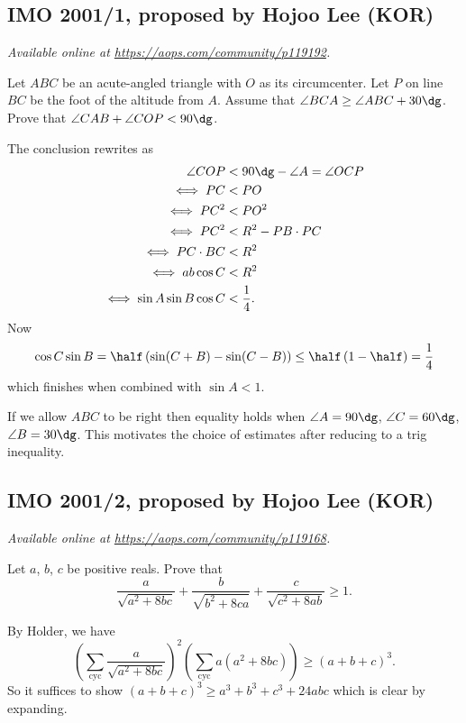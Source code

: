 \documentclass[11pt]{scrartcl}
\begin{document}
\subsection{IMO 2001/1, proposed by Hojoo Lee (KOR)}
\textsl{Available online at \url{https://aops.com/community/p119192}.}
\begin{mdframed}[style=mdpurplebox,frametitle={Problem statement}]
Let $ABC$ be an acute-angled triangle with $O$ as its circumcenter.
Let $P$ on line $BC$ be the foot of the altitude from $A$.
Assume that $\angle BCA \ge \angle ABC + 30\dg$.
Prove that $\angle CAB + \angle COP < 90\dg$.
\end{mdframed}
The conclusion rewrites as
\begin{align*}
  \angle COP &< 90\dg - \angle A = \angle OCP \\
  \iff PC &< PO \\
  \iff PC^2 &< PO^2 \\
  \iff PC^2 &< R^2 - PB \cdot PC \\
  \iff PC \cdot BC &< R^2 \\
  \iff ab \cos C  &< R^2 \\
  \iff \sin A \sin B \cos C & < \frac14.
\end{align*}
Now
\[ \cos C \sin B
  = \half \left( \sin(C+B)-\sin(C-B) \right)
  \le \half \left( 1 - \half \right) = \frac 14 \]
which finishes when combined with $\sin A < 1$.

\begin{remark*}
  If we allow $ABC$ to be right then
  equality holds when $\angle A = 90\dg$,
  $\angle C = 60\dg$, $\angle B = 30\dg$.
  This motivates the choice of estimates
  after reducing to a trig inequality.
\end{remark*}
\pagebreak

\subsection{IMO 2001/2, proposed by Hojoo Lee (KOR)}
\textsl{Available online at \url{https://aops.com/community/p119168}.}
\begin{mdframed}[style=mdpurplebox,frametitle={Problem statement}]
Let $a$, $b$, $c$ be positive reals. Prove that
\[ \frac{a}{\sqrt{a^2+8bc}} + \frac{b}{\sqrt{b^2+8ca}} + \frac{c}{\sqrt{c^2+8ab}} \ge 1. \]
\end{mdframed}
By Holder, we have
\[
  \left( \sum_{\text{cyc}} \frac{a}{\sqrt{a^2+8bc}} \right)^2
  \left( \sum_{\text{cyc}} a(a^2+8bc) \right)
  \ge (a+b+c)^3.
\]
So it suffices to show $(a+b+c)^3 \ge a^3+b^3+c^3+24abc$ which is clear by expanding.
\pagebreak
\end{document}
